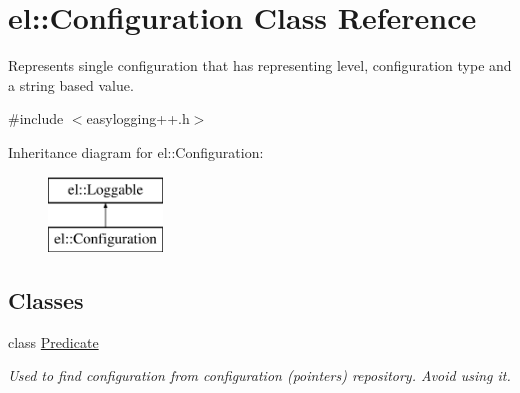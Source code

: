 \hypertarget{classel_1_1_configuration}{}\section{el\+:\+:Configuration Class Reference}
\label{classel_1_1_configuration}


Represents single configuration that has representing level, configuration type and a string based value.  




{\ttfamily \#include $<$easylogging++.\+h$>$}

Inheritance diagram for el\+:\+:Configuration\+:\begin{figure}[H]
\begin{center}
\leavevmode
\includegraphics[height=2.000000cm]{classel_1_1_configuration}
\end{center}
\end{figure}
\subsection*{Classes}
\begin{DoxyCompactItemize}
\item 
class \hyperlink{classel_1_1_configuration_1_1_predicate}{Predicate}
\begin{DoxyCompactList}\small\item\em Used to find configuration from configuration (pointers) repository. Avoid using it. \end{DoxyCompactList}\end{DoxyCompactItemize}

